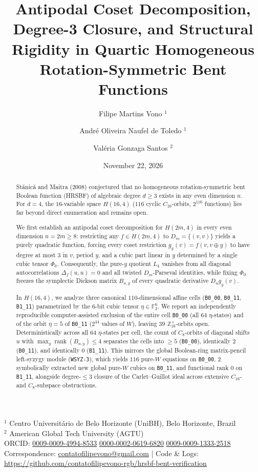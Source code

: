 \documentclass[11pt,a4paper]{article}
\title{Antipodal Coset Decomposition, Degree-3 Closure, and Structural Rigidity in Quartic Homogeneous Rotation-Symmetric Bent Functions}
\author{Filipe Martins Vono $^{1}$ \and Andr\'e Oliveira Naufel de Toledo $^{1}$ \and Val\'eria Gonzaga Santos $^{2}$}
\date{November 22, 2026}
\theoremstyle{definition}
\newcommand{\F}{\mathbb{F}_2}
\newcommand{\Z}{\mathbb{Z}}
\newcommand{\rk}{\operatorname{rank}}
\begin{document}
\maketitle
\begin{center}\small
$^{1}$ Centro Universit\'ario de Belo Horizonte (UniBH), Belo Horizonte, Brazil\\
$^{2}$ American Global Tech University (AGTU)\\
ORCID: \href{https://orcid.org/0009-0009-4994-8533}{0009-0009-4994-8533}\quad
\href{https://orcid.org/0000-0002-0619-6820}{0000-0002-0619-6820}\quad
\href{https://orcid.org/0009-0009-1333-2518}{0009-0009-1333-2518}\\
Correspondence: \href{mailto:contatofilipevono@gmail.com}{contatofilipevono@gmail.com} \quad|\quad
Code \& Logs: \url{https://github.com/contatofilipevono-rgb/hrsbf-bent-verification}
\end{center}

\begin{abstract}
St\u{a}nic\u{a} and Maitra (2008) conjectured that no homogeneous rotation-symmetric bent Boolean function (HRSBF) of algebraic degree $d \ge 3$ exists in any even dimension $n$. For $d=4$, the $16$-variable space $H(16,4)$ ($116$ cyclic $C_{16}$-orbits, $2^{116}$ functions) lies far beyond direct enumeration and remains open.

We first establish an antipodal coset decomposition for $H(2m,4)$ in every even dimension $n=2m \ge 8$: restricting any $f \in H(2m,4)$ to $D_m = \{(v,v)\}$ yields a purely quadratic function, forcing every coset restriction $g_y(v) = f(v, v \oplus y)$ to have degree at most $3$ in $v$, period $y$, and a cubic part linear in $y$ determined by a single cubic tensor $\Phi_0$. Consequently, the pure-$y$ quotient $L_4$ vanishes from all diagonal autocorrelations $\Delta_f(u,u)=0$ and all twisted $D_m$-Parseval identities, while fixing $\Phi_0$ freezes the symplectic Dickson matrix $B_{u,y}$ of every quadratic derivative $D_u g_y(v)$.

In $H(16,4)$, we analyze three canonical $110$-dimensional affine cells (\texttt{B0\_00}, \texttt{B0\_11}, \texttt{B1\_11}) parametrized by the $6$-bit cubic tensor $\eta \in \F^6$. We report an independently reproducible computer-assisted exclusion of the entire cell \texttt{B0\_00} (all $64$ $\eta$-states) and of the orbit $\eta=5$ of \texttt{B0\_11} ($2^{44}$ values of $W$), leaving $39$ $\Z_{16}^\times$-orbits open. Deterministically across all $64$ $\eta$-states per cell, the count of $C_8$-orbits of diagonal shifts $u$ with $\max_y \rk(B_{u,y}) \le 4$ separates the cells into $\ge 5$ (\texttt{B0\_00}), identically $2$ (\texttt{B0\_11}), and identically $0$ (\texttt{B1\_11}). This mirrors the global Boolean-ring matrix-pencil left-syzygy module (\texttt{WSYZ-3}), which yields $116$ pure-$W$ equations on \texttt{B0\_00}, $2$ symbolically extracted new global pure-$W$ cubics on \texttt{B0\_11}, and functional rank $0$ on \texttt{B1\_11}, alongside degree-$\le 3$ closure of the Carlet--Guillot ideal across extensive $C_{16}$- and $C_8$-subspace obstructions.
\end{abstract}
\end{document}
